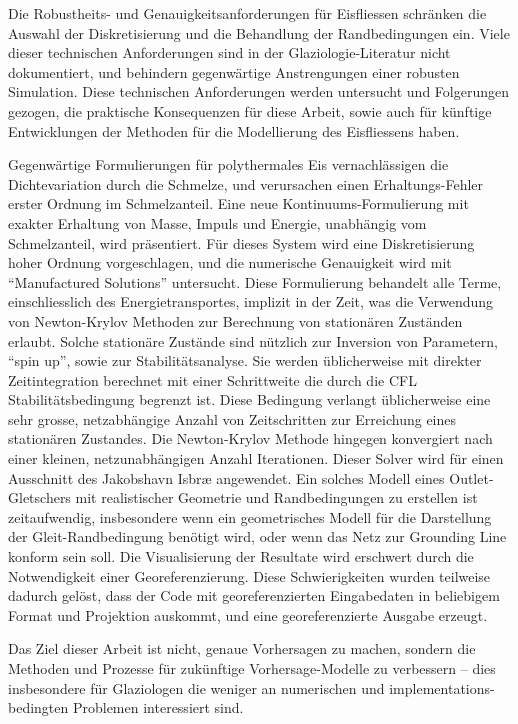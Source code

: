 Die Robustheits- und Genauigkeitsanforderungen für Eisfliessen schränken die
Auswahl der Diskretisierung und die Behandlung der Randbedingungen ein.  Viele
dieser technischen Anforderungen sind in der Glaziologie-Literatur nicht
dokumentiert, und behindern gegenwärtige Anstrengungen einer robusten
Simulation.  Diese technischen Anforderungen werden untersucht und Folgerungen
gezogen, die praktische Konsequenzen für diese Arbeit, sowie auch für künftige
Entwicklungen der Methoden für die Modellierung des Eisfliessens haben.

Gegenwärtige Formulierungen für polythermales Eis vernachlässigen die
Dichtevariation durch die Schmelze, und verursachen einen Erhaltungs-Fehler
erster Ordnung im Schmelzanteil.  Eine neue Kontinuums-Formulierung mit
exakter Erhaltung von Masse, Impuls und Energie, unabhängig vom Schmelzanteil,
wird präsentiert.  Für dieses System wird eine Diskretisierung hoher Ordnung
vorgeschlagen, und die numerische Genauigkeit wird mit ``Manufactured
Solutions'' untersucht.  Diese Formulierung behandelt alle Terme,
einschliesslich des Energietransportes, implizit in der Zeit, was die
Verwendung von Newton-Krylov Methoden zur Berechnung von stationären Zuständen
erlaubt.  Solche stationäre Zustände sind nützlich zur Inversion von
Parametern, ``spin up'', sowie zur Stabilitätsanalyse.  Sie werden
üblicherweise mit direkter Zeitintegration berechnet mit einer Schrittweite
die durch die CFL Stabilitätsbedingung begrenzt ist.  Diese Bedingung verlangt
üblicherweise eine sehr grosse, netzabhängige Anzahl von Zeitschritten zur
Erreichung eines stationären Zustandes.  Die Newton-Krylov Methode hingegen
konvergiert nach einer kleinen, netzunabhängigen Anzahl Iterationen.  Dieser
Solver wird für einen Ausschnitt des Jakobshavn Isbr{\ae} angewendet.  Ein
solches Modell eines Outlet-Gletschers mit realistischer Geometrie und
Randbedingungen zu erstellen ist zeitaufwendig, insbesondere wenn ein
geometrisches Modell für die Darstellung der Gleit-Randbedingung benötigt
wird, oder wenn das Netz zur Grounding Line konform sein soll.  Die
Visualisierung der Resultate wird erschwert durch die Notwendigkeit einer
Georeferenzierung.  Diese Schwierigkeiten wurden teilweise dadurch gelöst,
dass der Code mit georeferenzierten Eingabedaten in beliebigem Format und
Projektion auskommt, und eine georeferenzierte Ausgabe erzeugt.

Das Ziel dieser Arbeit ist nicht, genaue Vorhersagen zu machen, sondern die
Methoden und Prozesse für zukünftige Vorhersage-Modelle zu verbessern -- dies
insbesondere für Glaziologen die weniger an numerischen und
implementations-bedingten Problemen interessiert sind. 

